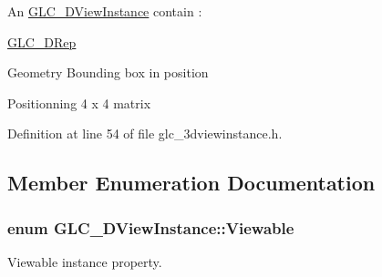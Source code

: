 An \hyperlink{class_g_l_c__3_d_view_instance}{G\-L\-C\-\_\-D\-View\-Instance} contain \-:
\begin{DoxyItemize}
\item \hyperlink{class_g_l_c__3_d_rep}{G\-L\-C\-\_\-D\-Rep}
\item Geometry Bounding box in position
\item Positionning 4 x 4 matrix 
\end{DoxyItemize}

Definition at line 54 of file glc\-\_\-3dviewinstance.\-h.



\subsection{Member Enumeration Documentation}
\hypertarget{class_g_l_c__3_d_view_instance_a34f78b0d3fce3d0325b4538d707c5d2b}{
\subsubsection[{Viewable}]{\setlength{\rightskip}{0pt plus 5cm}enum {\bf G\-L\-C\-\_\-D\-View\-Instance\-::\-Viewable}}}\label{class_g_l_c__3_d_view_instance_a34f78b0d3fce3d0325b4538d707c5d2b}


Viewable instance property. 

